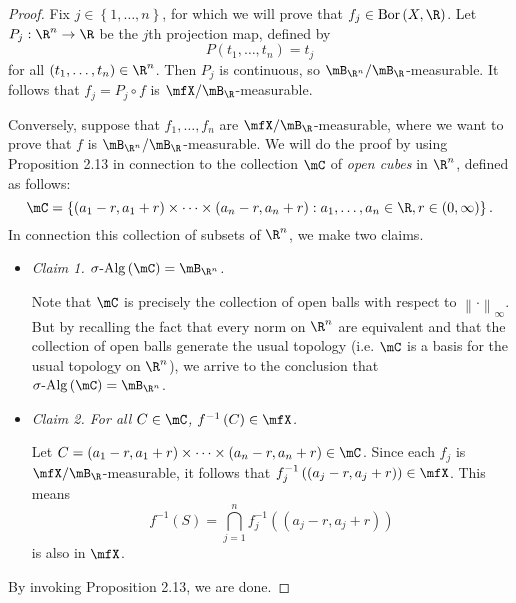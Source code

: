 \documentclass[pmath450]{subfiles}
\begin{document}
    \begin{proof}
        Fix $j\in\left\lbrace 1,\ldots,n \right\rbrace$, for which we will prove that $f_j\in\bor\left( X,\R \right)$. Let $P_j:\R^n\to\R$ be the $j$th projection map, defined by
        \begin{equation*}
            P\left( t_1,\ldots,t_n \right)=t_j
        \end{equation*}
        for all $\left( t_1,\ldots,t_n \right)\in\R^n$. Then $P_j$ is continuous, so $\mB_{\R^n}/\mB_{\R}$-measurable. It follows that $f_j=P_j\circ f$ is $\mfX /\mB_{\R}$-measurable.

        Conversely, suppose that $f_1,\ldots,f_n$ are $\mfX /\mB_{\R}$-measurable, where we want to prove that $f$ is $\mB_{\R^n} /\mB_{\R}$-measurable. We will do the proof by using Proposition 2.13 in connection to the collection $\mC$ of \textit{open cubes} in $\R^n$, defined as follows:
        \begin{equation*}
            \mC = \left\lbrace \left( a_1-r,a_1+r \right)\times\cdots\times\left( a_n-r,a_n+r \right): a_1,\ldots,a_n\in\R, r\in\left( 0,\infty \right) \right\rbrace.
        \end{equation*}
        In connection this collection of subsets of $\R^n$, we make two claims.
        \begin{itemize}
            \item \textit{Claim 1. $\sigalg\left( \mC \right)=\mB_{\R^n}$.}

                \begin{subproof}
                    Note that $\mC$ is precisely the collection of open balls with respect to $\left\lVert \cdot \right\rVert_{\infty}$. But by recalling the fact that every norm on $\R^n$ are equivalent and that the collection of open balls generate the usual topology (i.e. $\mC$ is a basis for the usual topology on $\R^n$), we arrive to the conclusion that $\sigalg\left( \mC \right)=\mB_{\R^n}$.
                \end{subproof}

            \item \textit{\textit{Claim 2. For all $C\in\mC$, $f^{-1}\left( C \right)\in\mfX$.}}

                \begin{subproof}
                    Let $C=\left( a_1-r,a_1+r \right)\times\cdots\times\left( a_n-r,a_n+r \right)\in\mC$. Since each $f_j$ is $\mfX /\mB_{\R}$-measurable, it follows that $f_j^{-1}\left( \left( a_j-r,a_j+r \right) \right)\in\mfX$. This means
                    \begin{equation*}
                        f^{-1}\left( S \right) = \bigcap^{n}_{j=1}f_j^{-1}\left( \left( a_j-r,a_j+r \right) \right)
                    \end{equation*}
                    is also in $\mfX$.
                \end{subproof}
        \end{itemize} 
        By invoking Proposition 2.13, we are done.
    \end{proof}
\end{document}
